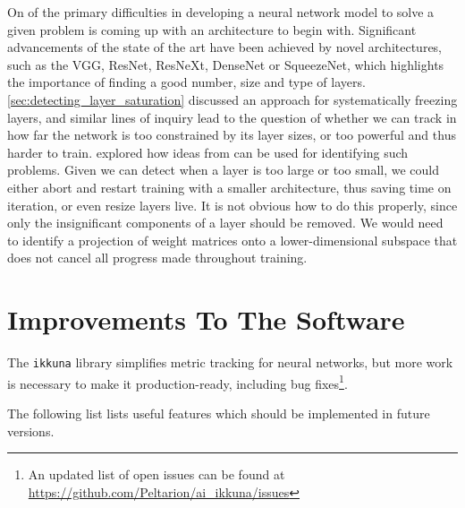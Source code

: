 On of the primary difficulties in developing a neural network model to solve a
given problem is coming up with an architecture to begin with. Significant
advancements of the state of the art have been achieved by novel architectures,
such as the VGG, ResNet, ResNeXt, DenseNet or SqueezeNet, which highlights the
importance of finding a good number, size and type of layers.
\cref{sec:detecting_layer_saturation} discussed an approach for systematically freezing
layers, and similar lines of inquiry lead to the question of whether we can
track in how far the network is too constrained by its layer sizes, or too
powerful and thus harder to train. \citet{shenk2018} explored how ideas from
\citep{raghu2017svcca} can be used for identifying such problems. Given we can
detect when a layer is too large or too small, we could either abort and restart
training with a smaller architecture, thus saving time on iteration, or even
resize layers live. It is not obvious how to do this properly, since only the
insignificant components of a layer should be removed. We would need to identify
a projection of weight matrices onto a lower-dimensional subspace that does not
cancel all progress made throughout training.


\section{Improvements To The Software}%
\label{sec:improvements_to_the_software}

The \texttt{ikkuna} library simplifies metric tracking for neural networks, but
more work is necessary to make it production-ready, including bug
fixes\footnote{An updated list of open issues can  be found at
\url{https://github.com/Peltarion/ai_ikkuna/issues}}.

The following list lists useful features which should be implemented in future
versions.

